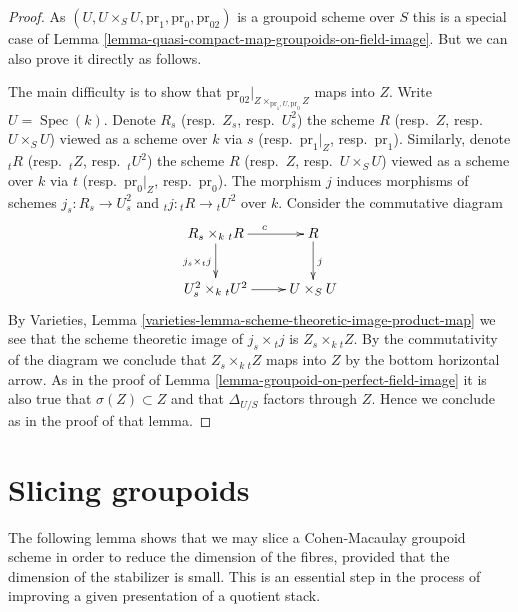 \documentclass{stacks-project}
\theoremstyle{plain}
\theoremstyle{definition}
\theoremstyle{remark}
\numberwithin{equation}{subsection}
\def\Spec{\mathop{\mathrm{Spec}}}
\begin{document}
\begin{proof}
As $(U, U \times_S U, \text{pr}_1, \text{pr}_0, \text{pr}_{02})$
is a groupoid scheme over $S$ this is a special case of
Lemma \ref{lemma-quasi-compact-map-groupoids-on-field-image}.
But we can also prove it directly as follows.

\medskip\noindent
The main difficulty is to show that
$\text{pr}_{02}|_{Z \times_{\text{pr}_1, U, \text{pr}_0} Z}$
maps into $Z$.
Write $U = \Spec(k)$. Denote
$R_s$ (resp.\ $Z_s$, resp.\ $U^2_s$) the scheme
$R$ (resp.\ $Z$, resp.\ $U \times_S U$) viewed as a scheme over $k$ via
$s$ (resp.\ $\text{pr}_1|_Z$, resp.\ $\text{pr}_1$).
Similarly, denote
${}_tR$ (resp.\ ${}_tZ$, resp.\ ${}_tU^2$) the scheme
$R$ (resp.\ $Z$, resp.\ $U \times_S U$) viewed as a scheme over $k$ via
$t$ (resp.\ $\text{pr}_0|_Z$, resp.\ $\text{pr}_0$).
The morphism $j$ induces morphisms of schemes
$j_s : R_s \to U^2_s$ and ${}_tj : {}_tR \to {}_tU^2$ over $k$.
Consider the commutative diagram
$$
\xymatrix{
R_s \times_k {}_tR \ar[r]^c \ar[d]_{j_s \times {}_tj} &  R \ar[d]^j \\
U^2_s \times_k {}_tU^2 \ar[r] & U \times_S U
}
$$
By
Varieties, Lemma \ref{varieties-lemma-scheme-theoretic-image-product-map}
we see that the scheme theoretic image of $j_s \times {}_tj$ is
$Z_s \times_k {}_tZ$. By the commutativity of the diagram we
conclude that $Z_s \times_k {}_tZ$ maps into $Z$ by the bottom
horizontal arrow. As in the proof of
Lemma \ref{lemma-groupoid-on-perfect-field-image}
it is also true that $\sigma(Z) \subset Z$ and that
$\Delta_{U/S}$ factors through $Z$. Hence we conclude as in the
proof of that lemma.
\end{proof}







\section{Slicing groupoids}
\label{section-slicing}

\noindent
The following lemma shows that we may slice a Cohen-Macaulay groupoid scheme
in order to reduce the dimension of the fibres, provided that the
dimension of the stabilizer is small. This is an essential step in
the process of improving a given presentation of a quotient stack.
\end{document}
